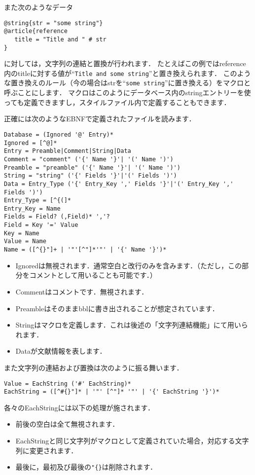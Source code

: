 \documentclass[a4paper]{ltjsarticle}
\newcommand*{\luastring}[1]{``\texttt{#1}''}
\begin{document}
また次のようなデータ
\begin{verbatim}
@string{str = "some string"}
@article{reference
   title = "Title and " # str
}
\end{verbatim}
に対しては，文字列の連結と置換が行われます．
たとえばこの例ではreference内のtitleに対する値が\luastring{Title and some string}と置き換えられます．
このような置き換えのルール（今の場合はstrを\luastring{some string}に置き換える）をマクロと呼ぶことにします．
マクロはこのようにデータベース内のstringエントリーを使っても定義できますし，スタイルファイル内で定義することもできます．


正確には次のようなEBNFで定義されたファイルを読みます．
\begin{verbatim}
Database = (Ignored '@' Entry)*
Ignored = [^@]*
Entry = Preamble|Comment|String|Data
Comment = "comment" ('{' Name '}'| '(' Name ')')
Preamble = "preamble" ('{' Name '}'| '(' Name ')')
String = "string" ('{' Fields '}'|'(' Fields ')')
Data = Entry_Type ('{' Entry_Key ',' Fields '}'|'(' Entry_Key ',' Fields ')')
Entry_Type = [^{(]*
Entry_Key = Name
Fields = Field? (,Field)* ','?
Field = Key '=' Value
Key = Name
Value = Name
Name = ([^{}"]+ | '"'[^"]*'"' | '{' Name '}')*
\end{verbatim}

\begin{itemize}
\item Ignoredは無視されます．通常空白と改行のみを含みます．（ただし，この部分をコメントとして用いることも可能です．）
\item Commentはコメントです．無視されます．
\item Preambleはそのままbblに書き出されることが想定されています．
\item Stringはマクロを定義します．これは後述の「文字列連結機能」にて用いられます．
\item Dataが文献情報を表します．
\end{itemize}


また文字列の連結および置換は次のように振る舞います．
\begin{verbatim}
Value = EachString ('#' EachString)*
EachString = ([^#{}"]* | '"' [^"]* '"' | '{' EachString '}')*
\end{verbatim}
各々のEachStringには以下の処理が施されます．
\begin{itemize}
\item 前後の空白は全て無視されます．
\item EachStringと同じ文字列がマクロとして定義されていた場合，対応する文字列に変更されます．
\item 最後に，最初及び最後の\verb|"{}|は削除されます．
\end{itemize}
\end{document}
